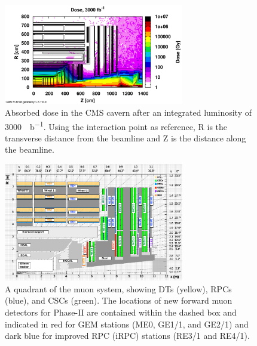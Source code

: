	\begin{figure}[H]
		\centering
		\includegraphics[width=0.7\textwidth]{fig/chapt3/HL-LHC-Dose.png}
		\caption{\label{fig:Dose} Absorbed dose in the CMS cavern after an integrated luminosity of \SI{3000}{\femto\per\barn}. Using the interaction point as reference, R is the transverse distance from the beamline and Z is the distance along the beamline.}
	\end{figure}
	
	\begin{figure}[H]
		\centering
		\includegraphics[width=0.7\textwidth]{fig/chapt3/Phase2_Muon_quadrant.pdf}
		\caption{\label{fig:P2Quadrant} A quadrant of the muon system, showing DTs (yellow), RPCs (blue), and CSCs (green). The locations of new forward muon detectors for Phase-II are contained within the dashed box and indicated in red for GEM stations (ME0, GE1/1, and GE2/1) and dark blue for improved RPC (iRPC) stations (RE3/1 and RE4/1).}
	\end{figure}
	
